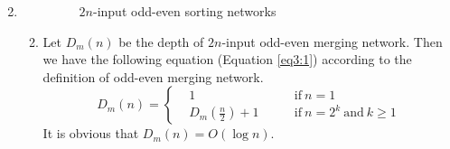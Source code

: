 \documentclass[12pt,a4paper]{article}
\makeatletter
\newtheorem*{solution}{Solution}
\theoremstyle{definition}
\renewenvironment{solution}[1][Solution] {\par\pushQED{\qed}\normalfont\topsep6\p@\@plus6\p@\relax\trivlist\item[\hskip\labelsep\bfseries#1\@addpunct{.}]\ignorespaces}{\popQED\endtrivlist\@endpefalse} \makeatother
\makeatother
\begin{document}
\begin{enumerate}
\begin{solution}
\begin{enumerate}
\begin{figure}[h]
        \centering
        \caption{$2n$-input odd-even sorting networks}
        \label{fig:1}
    \end{figure}
    \item Let $D_m(n)$ be the depth of $2n$-input odd-even merging network. Then we have the following equation (Equation \eqref{eq3:1}) according to the definition of odd-even merging network.
        \begin{equation}
        D_m(n) = \left\{
        \begin{aligned}
        & 1 & \quad \quad \mathrm{if\ } n = 1 \\
        & D_m\left(\frac{n}{2}\right) + 1 & \quad \quad \mathrm{if\ } n = 2^k \mathrm{\ and\ } k \geq 1
        \end{aligned}
        \right.
        \label{eq3:1}
        \end{equation}
        It is obvious that $D_m(n) = O(\log{n})$.


\end{enumerate}
\end{solution}
\end{enumerate}
\end{document}
